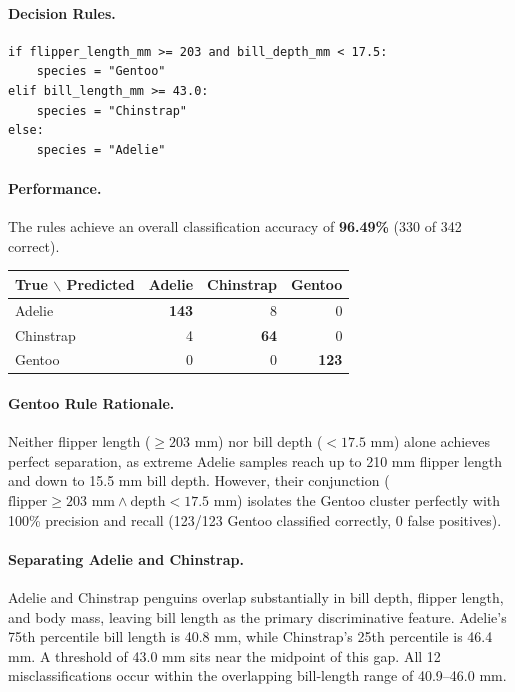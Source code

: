 \documentclass[11pt]{article}
\begin{document}
\paragraph{Decision Rules.}
\begin{Verbatim}
if flipper_length_mm >= 203 and bill_depth_mm < 17.5:
    species = "Gentoo"
elif bill_length_mm >= 43.0:
    species = "Chinstrap"
else:
    species = "Adelie"
\end{Verbatim}

\paragraph{Performance.}
The rules achieve an overall classification accuracy of \textbf{96.49\%} (330 of 342 correct).

\begin{center}\small
\begin{tabular}{lrrr}
\toprule
True $\backslash$ Predicted & Adelie & Chinstrap & Gentoo \\
\midrule
Adelie & \textbf{143} & 8 & 0 \\
Chinstrap & 4 & \textbf{64} & 0 \\
Gentoo & 0 & 0 & \textbf{123} \\
\bottomrule
\end{tabular}
\end{center}

\paragraph{Gentoo Rule Rationale.}
Neither flipper length ($\ge 203$ mm) nor bill depth ($< 17.5$ mm) alone achieves perfect separation, as extreme Adelie samples reach up to 210 mm flipper length and down to 15.5 mm bill depth. However, their conjunction ($\text{flipper} \ge 203\text{ mm} \land \text{depth} < 17.5\text{ mm}$) isolates the Gentoo cluster perfectly with 100\% precision and recall (123/123 Gentoo classified correctly, 0 false positives).

\paragraph{Separating Adelie and Chinstrap.}
Adelie and Chinstrap penguins overlap substantially in bill depth, flipper length, and body mass, leaving bill length as the primary discriminative feature. Adelie's 75th percentile bill length is 40.8 mm, while Chinstrap's 25th percentile is 46.4 mm. A threshold of 43.0 mm sits near the midpoint of this gap. All 12 misclassifications occur within the overlapping bill-length range of 40.9--46.0 mm.
\end{document}
